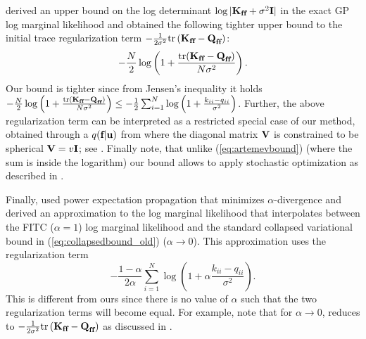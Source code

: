 \citet{artemevburt2021cglb}
derived an upper bound on the log determinant $\log |\textbf{K}_{\textbf{f} \textbf{f}} + \sigma^2 \textbf{I}|$ in the exact GP log marginal likelihood and obtained the following tighter upper bound to the initial trace 
regularization term $-\frac{1}{2 \sigma^2} \text{tr}\left(  \textbf{K}_{\textbf{f}\textbf{f}} - \textbf{Q}_{\textbf{f}\textbf{f}} \right)$: 
\begin{equation}
- \frac{N}{ 2} \log\left( 1 + 
\frac{\text{tr}(\textbf{K}_{\textbf{f}\textbf{f}} - \textbf{Q}_{\textbf{f}\textbf{f}})}{N \sigma^2} \right).
\label{eq:artemevbound}
\end{equation}
Our bound is tighter since 
from Jensen's inequality 
it holds $ - \frac{N}{ 2} \log\left( 1 + 
\frac{\text{tr}(\textbf{K}_{\textbf{f}\textbf{f}} - \textbf{Q}_{\textbf{f}\textbf{f}})}{N \sigma^2} \right)
\leq - \frac{1}{2} \sum_{i=1}^N \log\left( 1 + 
\frac{k_{ii} - q_{ii}}{\sigma^2} \right)$. Further, the above regularization term
can be interpreted as a restricted special case of our method, obtained through a $q(\textbf{f} | \textbf{u})$ from  where the diagonal matrix $\textbf{V}$ is constrained to be spherical $\textbf{V} = v  \textbf{I}$; see . Finally note, 
that unlike (\ref{eq:artemevbound}) 
(where the sum is inside the logarithm) our bound allows to apply stochastic optimization
as described in .

Finally, 
\citet{Buietal2017}
used  power expectation 
propagation that minimizes  $\alpha$-divergence and derived an approximation 
to the log marginal likelihood that interpolates between the FITC ($\alpha=1$) log marginal 
likelihood \cite{Snelson2006,candela-rasmussen-05} and the standard collapsed 
variational bound in (\ref{eq:collapsedbound_old})
($\alpha \rightarrow 0$).
This approximation uses the regularization 
term 
\begin{equation}
-\frac{1-\alpha}{2 \alpha}
\sum_{i=1}^N \log\left( 1 + 
\alpha \frac{k_{ii} - q_{ii}}{\sigma^2} \right). 
\label{eq:Buiregularization}
\end{equation}
This is different from 
ours since
there is no value of $\alpha$ 
such that the two regularization terms will become equal. 
For example, note that for $\alpha \rightarrow 0$,  
reduces to $-\frac{1}{2 \sigma^2} \text{tr}\left(  \textbf{K}_{\textbf{f}\textbf{f}} - \textbf{Q}_{\textbf{f}\textbf{f}} \right)$ as discussed 
in \citet{Buietal2017}. 
